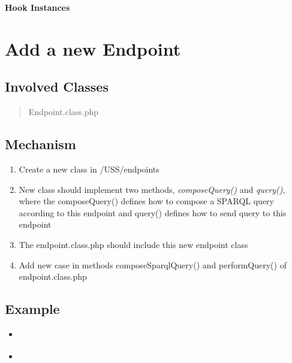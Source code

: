 \documentclass[letterpaper,10pt,english]{sphinxmanual}
\begin{document}
\textbf{Hook Instances}


\section{Add a new Endpoint}
\label{docs/hooks/new_endpoint::doc}\label{docs/hooks/new_endpoint:add-a-new-endpoint}\label{docs/hooks/new_endpoint:hook-new-endpoint}

\subsection{Involved Classes}
\label{docs/hooks/new_endpoint:involved-classes}\begin{quote}

Endpoint.class.php
\end{quote}


\subsection{Mechanism}
\label{docs/hooks/new_endpoint:mechanism}\begin{enumerate}
\item {} 
Create a new class in /USS/endpoints

\item {} 
New class should implement two methods, \emph{composeQuery()} and \emph{query()}, where the composeQuery() defines how to compose a SPARQL query according to this endpoint and query() defines how to send query to this endpoint

\item {} 
The endpoint.class.php should include this new endpoint class

\item {} 
Add new case in methods composeSparqlQuery() and performQuery() of endpoint.class.php

\end{enumerate}


\subsection{Example}
\label{docs/hooks/new_endpoint:example}\begin{itemize}
\item {} 
{\hyperref[docs/api:Dbpedia]{}}

\item {} 
{\hyperref[docs/api:LinkedGeoData]{}}

\end{itemize}
\end{document}
